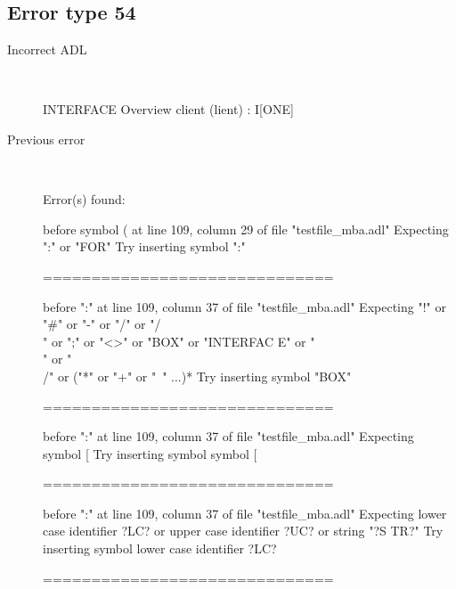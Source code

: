 \hrulefill

\subsection{Error type 54}
  \begin{description}
  \item[Incorrect ADL]~\\
\begin{adl}
INTERFACE Overview {client} (lient) : I[ONE]\end{adl}
  \item[Previous error]~\\
\begin{haskell}
Error(s) found:

before symbol ( at line 109, column 29 of file "testfile_mba.adl"
Expecting ":" or "FOR"
Try inserting symbol ":"

==============================

before ":" at line 109, column 37 of file "testfile_mba.adl"
Expecting "!" or "#" or "-" or "/" or "/\\" or ";" or "<>" or "BOX" or "INTERFAC
E" or "\\" or "\\/" or ("*" or "+" or "~" ...)*
Try inserting symbol "BOX"

==============================

before ":" at line 109, column 37 of file "testfile_mba.adl"
Expecting symbol [
Try inserting symbol symbol [

==============================

before ":" at line 109, column 37 of file "testfile_mba.adl"
Expecting lower case identifier ?LC? or upper case identifier ?UC? or string "?S
TR?"
Try inserting symbol lower case identifier ?LC?

==============================


\end{haskell}
\end{description}
